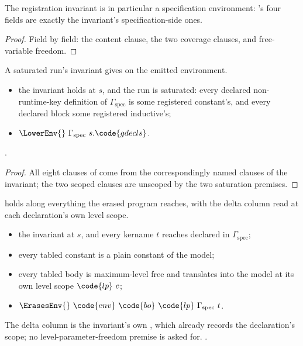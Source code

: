 \begin{lemma}
\label{lem:RegInvShape-prime-specEnv}
\leanok
{}
 The registration invariant is in particular a specification environment: 's
four fields are exactly the invariant's specification-side ones.
\end{lemma}
\begin{proof}
\leanok
{}
 Field by field: the content clause, the two coverage clauses, and free-variable freedom.
\end{proof}
\begin{theorem}
\label{thm:RegInvShape-prime-lowerEnv}
\leanok
{}
 A saturated run's invariant gives \hl{\LowerEnv{}} on the emitted environment.
\begin{itemize}
\item {} the invariant holds at $s$, and the run is saturated: every declared non-runtime-key
definition of $\Gamma_{\mathrm{spec}}$ is some registered constant's, and every declared block some
registered inductive's;
\item {} $\LowerEnv{}\ \Gamma_{\mathrm{spec}}\ s.\code{gdecls}$.
\end{itemize}
 \stProved{}.
\end{theorem}
\begin{proof}
\leanok
{}
 All eight clauses of  come from the correspondingly named clauses of the
invariant; the two scoped clauses are unscoped by the two saturation premises.
\end{proof}
\begin{theorem}
\label{thm:RegInvShape-prime-erasesEnv}
\leanok
{}
 \hl{\ErasesEnv{}} holds along everything the erased program reaches, with the delta
column read at each declaration's own level scope.
\begin{itemize}
\item {} the invariant at $s$, and every kername $t$ reaches declared in
$\Gamma_{\mathrm{spec}}$;
\item every tabled constant is a plain constant of the model;
\item every tabled body is maximum-level free and translates into the model at its own level scope
$\code{lp}\ c$;
\item {} $\ErasesEnv{}\ \code{env}\ \code{bo}\ \code{lp}\ \Gamma_{\mathrm{spec}}\ t$.
\end{itemize}
 The delta column is the invariant's own , which already records the
declaration's scope; no level-parameter-freedom premise is asked for.
 \stProved{}.
\end{theorem}
